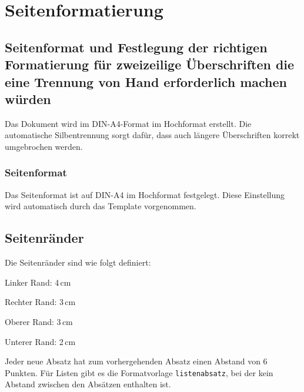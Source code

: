 
\chapter{Seitenformatierung}
\label{chap:seitenformatierung}

\section{Seitenformat und Festlegung der richtigen Formatierung für zweizeilige Überschriften die eine Trennung von Hand erforderlich machen würden}
\label{sec:seitenformat}

Das Dokument wird im DIN-A4-Format im Hochformat erstellt. Die automatische Silbentrennung sorgt dafür, dass auch längere Überschriften korrekt umgebrochen werden.

\subsection{Seitenformat}
\label{subsec:seitenformat_detail}

Das Seitenformat ist auf DIN-A4 im Hochformat festgelegt. Diese Einstellung wird automatisch durch das Template vorgenommen.

\section{Seitenränder}
\label{sec:seitenraender}

Die Seitenränder sind wie folgt definiert:
\begin{listenabsatz}
	\item Linker Rand: 4\,cm
	\item Rechter Rand: 3\,cm
	\item Oberer Rand: 3\,cm
	\item Unterer Rand: 2\,cm
\end{listenabsatz}

Jeder neue Absatz hat zum vorhergehenden Absatz einen Abstand von 6 Punkten. Für Listen gibt es die Formatvorlage \texttt{listenabsatz}, bei der kein Abstand zwischen den Absätzen enthalten ist.

